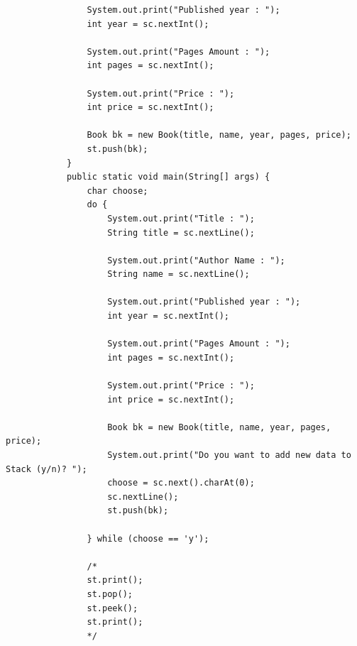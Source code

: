 \documentclass[12pt,titlepage]{article}
\begin{document}
\begin{enumerate}
\begin{verbatim}
                System.out.print("Published year : ");
                int year = sc.nextInt();

                System.out.print("Pages Amount : ");
                int pages = sc.nextInt();

                System.out.print("Price : ");
                int price = sc.nextInt();
                
                Book bk = new Book(title, name, year, pages, price);
                st.push(bk);
            }
            public static void main(String[] args) {
                char choose;
                do {
                    System.out.print("Title : ");
                    String title = sc.nextLine();
                    
                    System.out.print("Author Name : ");
                    String name = sc.nextLine();

                    System.out.print("Published year : ");
                    int year = sc.nextInt();

                    System.out.print("Pages Amount : ");
                    int pages = sc.nextInt();

                    System.out.print("Price : ");
                    int price = sc.nextInt();

                    Book bk = new Book(title, name, year, pages, price);
                    System.out.print("Do you want to add new data to Stack (y/n)? ");
                    choose = sc.next().charAt(0);
                    sc.nextLine();
                    st.push(bk);

                } while (choose == 'y');

                /* 
                st.print();
                st.pop();
                st.peek();
                st.print();
                */


\end{verbatim}
\end{enumerate}
\end{document}

